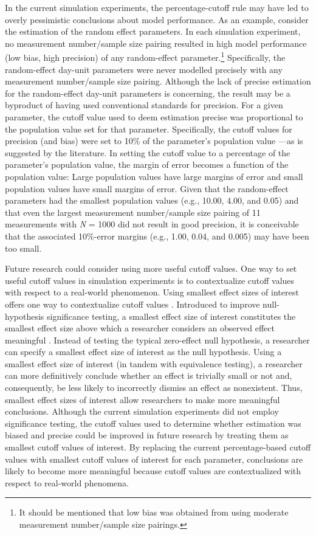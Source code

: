 \documentclass[
12pt, %
twoside,
english]{guelphthesis}
\begin{document}
In the current simulation experiments, the percentage-cutoff rule may have led to overly pessimistic conclusions about model performance. As an example, consider the estimation of the random effect parameters. In each simulation experiment, no measurement number/sample size pairing resulted in high model performance (low bias, high precision) of any random-effect parameter.\footnote{It should be mentioned that low bias was obtained from using moderate measurement number/sample size pairings.} Specifically, the random-effect day-unit parameters were never modelled precisely with any measurement number/sample size pairing. Although the lack of precise estimation for the random-effect day-unit parameters is concerning, the result may be a byproduct of having used conventional standards for precision. For a given parameter, the cutoff value used to deem estimation precise was proportional to the population value set for that parameter. Specifically, the cutoff values for precision (and bias) were set to 10\% of the parameter's population value \autocite{muthen1997}---as is suggested by the literature. In setting the cutoff value to a percentage of the parameter's population value, the margin of error becomes a function of the population value: Large population values have large margins of error and small population values have small margins of error. Given that the random-effect parameters had the smallest population values (e.g., 10.00, 4.00, and 0.05) and that even the largest measurement number/sample size pairing of 11 measurements with \emph{N} = 1000 did not result in good precision, it is conceivable that the associated 10\%-error margins (e.g., 1.00, 0.04, and 0.005) may have been too small.

Future research could consider using more useful cutoff values. One way to set useful cutoff values in simulation experiments is to contextualize cutoff values with respect to a real-world phenomenon. Using smallest effect sizes of interest offers one way to contextualize cutoff values \autocite{lakens2017,lakens2018}. Introduced to improve null-hypothesis significance testing, a smallest effect size of interest constitutes the smallest effect size above which a researcher considers an observed effect meaningful \autocite{lakens2017}. Instead of testing the typical zero-effect null hypothesis, a researcher can specify a smallest effect size of interest as the null hypothesis. Using a smallest effect size of interest (in tandem with equivalence testing), a researcher can more definitively conclude whether an effect is trivially small or not and, consequently, be less likely to incorrectly dismiss an effect as nonexistent. Thus, smallest effect sizes of interest allow researchers to make more meaningful conclusions. Although the current simulation experiments did not employ significance testing, the cutoff values used to determine whether estimation was biased and precise could be improved in future research by treating them as smallest cutoff values of interest. By replacing the current percentage-based cutoff values with smallest cutoff values of interest for each parameter, conclusions are likely to become more meaningful because cutoff values are contextualized with respect to real-world phenomena.
\end{document}
